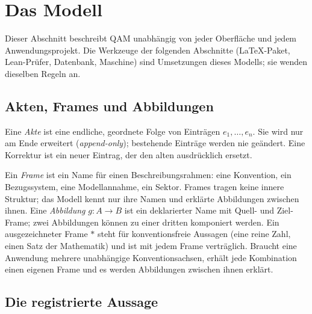 \section{Das Modell}\label{sec:modell}

Dieser Abschnitt beschreibt QAM unabhängig von jeder Oberfläche und jedem Anwendungsprojekt. Die Werkzeuge der folgenden Abschnitte
(\LaTeX-Paket, Lean-Prüfer, Datenbank, Maschine) sind Umsetzungen dieses Modells; sie wenden dieselben Regeln an.

\subsection{Akten, Frames und Abbildungen}

\begin{definition}[Akte]
Eine \emph{Akte} ist eine endliche, geordnete Folge von Einträgen \(e_1,\dots,e_n\). Sie wird nur am Ende erweitert (\emph{append-only});
bestehende Einträge werden nie geändert. Eine Korrektur ist ein neuer Eintrag, der den alten ausdrücklich ersetzt.
\end{definition}

Ein \emph{Frame} ist ein Name für einen Beschreibungsrahmen: eine Konvention, ein Bezugssystem, eine Modellannahme, ein Sektor. Frames
tragen keine innere Struktur; das Modell kennt nur ihre Namen und erklärte Abbildungen zwischen ihnen. Eine \emph{Abbildung}
\(g\colon A\to B\) ist ein deklarierter Name mit Quell- und Ziel-Frame; zwei Abbildungen können zu einer dritten komponiert werden. Ein
ausgezeichneter Frame \(*\) steht für konventionsfreie Aussagen (eine reine Zahl, einen Satz der Mathematik) und ist mit jedem Frame
verträglich. Braucht eine Anwendung mehrere unabhängige Konventionsachsen, erhält jede Kombination einen eigenen Frame und es werden
Abbildungen zwischen ihnen erklärt.

\subsection{Die registrierte Aussage}

